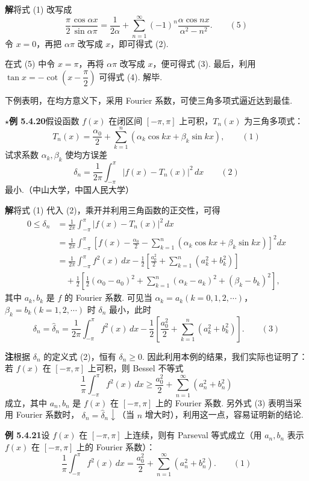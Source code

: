 \documentclass[UTF8, 12pt, fontset=fandol, oneside]{ctexart}
\begin{document}
\noindent\textbf{解}\quad 将式 (1) 改写成
\[
  \frac{\pi}{2}\frac{\cos\alpha x}{\sin\alpha\pi}
  =\frac1{2\alpha}+\sum_{n=1}^{\infty}(-1)^n\frac{\alpha\cos nx}{\alpha^2-n^2}. \qquad(5)
\]
令 $x=0$，再把 $\alpha\pi$ 改写成 $x$，即可得式 (2).

在式 (5) 中令 $x=\pi$，再将 $\alpha\pi$ 改写成 $x$，便可得式 (3). 最后，利用
$\tan x=-\cot\left(x-\dfrac{\pi}{2}\right)$ 可得式 (4). 解毕.

下例表明，在均方意义下，采用 Fourier 系数，可使三角多项式逼近达到最佳.

\noindent\(\star\)\textbf{例 5.4.20}\quad 假设函数 $f(x)$ 在闭区间 $[-\pi,\pi]$ 上可积，$T_n(x)$ 为三角多项式：
\[
  T_n(x)=\frac{\alpha_0}{2}+\sum_{k=1}^{n}(\alpha_k\cos kx+\beta_k\sin kx), \qquad(1)
\]
试求系数 $\alpha_k,\beta_k$ 使均方误差
\[
  \delta_n=\frac1{2\pi}\int_{-\pi}^{\pi}|f(x)-T_n(x)|^2\,dx \qquad(2)
\]
最小.（中山大学，中国人民大学）

\noindent\textbf{解}\quad 将式 (1) 代入 (2)，乘开并利用三角函数的正交性，可得
\[
\begin{aligned}
0\le\delta_n
&=\frac1{2\pi}\int_{-\pi}^{\pi}|f(x)-T_n(x)|^2\,dx\\
&=\frac1{2\pi}\int_{-\pi}^{\pi}
\left[f(x)-\frac{\alpha_0}{2}-\sum_{k=1}^{n}(\alpha_k\cos kx+\beta_k\sin kx)\right]^2dx\\
&=\frac1{2\pi}\int_{-\pi}^{\pi}f^2(x)\,dx
-\frac12\left[\frac{a_0^2}{2}+\sum_{k=1}^{n}(a_k^2+b_k^2)\right]\\
&\quad+\frac12\left[\frac12(\alpha_0-a_0)^2
+\sum_{k=1}^{n}(\alpha_k-a_k)^2+(\beta_k-b_k)^2\right],
\end{aligned}
\]
其中 $a_k,b_k$ 是 $f$ 的 Fourier 系数. 可见当
$\alpha_k=a_k(k=0,1,2,\cdots)$，$\beta_k=b_k(k=1,2,\cdots)$ 时
$\delta_n$ 最小，此时
\[
  \delta_n=\hat\delta_n=\frac1{2\pi}\int_{-\pi}^{\pi}f^2(x)\,dx
  -\frac12\left[\frac{a_0^2}{2}+\sum_{k=1}^{n}(a_k^2+b_k^2)\right]. \qquad(3)
\]

\noindent\textbf{注}\quad 根据 $\delta_n$ 的定义式 (2)，恒有 $\delta_n\ge0$. 因此利用本例的结果，我们实际也证明了：若 $f(x)$ 在 $[-\pi,\pi]$ 上可积，则 Bessel 不等式
\[
  \frac1\pi\int_{-\pi}^{\pi}f^2(x)\,dx\ge
  \frac{a_0^2}{2}+\sum_{n=1}^{\infty}(a_n^2+b_n^2)
\]
成立，其中 $a_n,b_n$ 是 $f(x)$ 在 $[-\pi,\pi]$ 上的 Fourier 系数. 另外式 (3) 表明当采用 Fourier 系数时，
$\delta_n=\hat\delta_n\downarrow$（当 $n$ 增大时），利用这一点，容易证明新的结论.

\noindent\textbf{例 5.4.21}\quad 设 $f(x)$ 在 $[-\pi,\pi]$ 上连续，则有 Parseval 等式成立（用 $a_n,b_n$ 表示 $f(x)$ 在 $[-\pi,\pi]$ 上的 Fourier 系数）：
\[
  \frac1\pi\int_{-\pi}^{\pi}f^2(x)\,dx
  =\frac{a_0^2}{2}+\sum_{n=1}^{\infty}(a_n^2+b_n^2). \qquad(1)
\]
\end{document}
